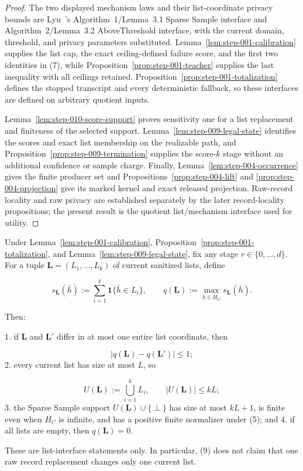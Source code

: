 \begin{proof}
The two displayed mechanism laws and their list-coordinate privacy bounds
are Lyu~\citep{lyu2025}'s Algorithm~1/Lemma~3.1 Sparse Sample interface and
Algorithm~2/Lemma~3.2 AboveThreshold interface, with the current domain,
threshold, and privacy parameters substituted.
Lemma~\ref{lem:step-001-calibration} supplies the list cap, the exact
ceiling-defined failure score, and the first two identities in (7), while
Proposition~\ref{prop:step-001-teacher} supplies the last inequality with
all ceilings retained.  Proposition~\ref{prop:step-001-totalization}
defines the stopped transcript and every deterministic fallback, so these
interfaces are defined on arbitrary quotient inputs.

Lemma~\ref{lem:step-010-score-support} proves sensitivity one for a list
replacement and finiteness of the selected support.  Lemma~\ref{lem:step-009-legal-state}
identifies the scores and exact list membership on the realizable path, and
Proposition~\ref{prop:step-009-termination} supplies the score-\(k\) stage
without an additional confidence or sample charge.  Finally,
Lemma~\ref{lem:step-004-occurrence} gives the finite producer set and
Propositions~\ref{prop:step-004-lift} and
\ref{prop:step-004-projection} give its marked kernel and exact released
projection.  Raw-record locality and raw privacy are established separately
by the later record-locality propositions; the present result is the
quotient list/mechanism interface used for utility.
\end{proof}



\begin{lemma}\label{lem:step-010-score-support}
Under Lemma~\ref{lem:step-001-calibration}, Proposition~\ref{prop:step-001-totalization}, and Lemma~\ref{lem:step-009-legal-state}, fix any stage
\(r\in\{0,\ldots,d\}\). For a tuple
\(\mathbf L=(L_1,\ldots,L_k)\) of current sanitized lists, define

\[
 s_{\mathbf L}(\bar h)
 :=\sum_{i=1}^k\mathbf1\{\bar h\in L_i\},
 \qquad
 q(\mathbf L):=\max_{\bar h\in H_C}s_{\mathbf L}(\bar h).
 \tag{8}
\]

Then:

1. if \(\mathbf L\) and \(\mathbf L'\) differ in at most one entire list
   coordinate, then

   \[
     |q(\mathbf L)-q(\mathbf L')|\leq1;
     \tag{9}
   \]
2. every current list has size at most \(L\), so

   \[
     U(\mathbf L):=\bigcup_{i=1}^kL_i,
     \qquad |U(\mathbf L)|\leq kL;
     \tag{10}
   \]
3. the Sparse Sample support
   \(U(\mathbf L)\cup\{\perp\}\) has size at most \(kL+1\), is finite even
   when \(H_C\) is infinite, and has a positive finite normalizer under
   (5); and
4. if all lists are empty, then \(q(\mathbf L)=0\).

These are list-interface statements only. In particular, (9) does not
claim that one raw record replacement changes only one current list.


\end{lemma}


